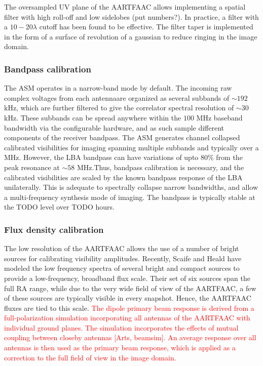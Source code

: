 \documentclass{aa}
\begin{document}
The oversampled UV plane of the AARTFAAC allows implementing a spatial
filter with high roll-off and low sidelobes (put numbers?). In practice,
a filter with a $10-20\lambda$ cutoff has been found to be effective.
The filter taper is implemented in the form of a surface of revolution
of a gaussian to reduce ringing in the image domain.


\subsubsection{Bandpass calibration}

The ASM operates in a narrow-band mode by default. The incoming raw
complex voltages from each antennaare organized as several subbands
of $\sim$$192$ kHz, which are further filtered to give the correlator
spectral resolution of $\sim$$30$ kHz. These subbands can be spread
anywhere within the $100$ MHz baseband bandwidth via the configurable
hardware, and as such sample different components of the receiver
bandpass. The ASM generates channel collapsed calibrated visibilities
for imaging spanning multiple subbands and typically over a MHz. However,
the LBA bandpass can have variations of upto 80\% from the peak resonance
at $\sim$$58$ MHz\citep{vanhaarlem2013lofar}.Thus, bandpass calibration
is necessary, and the calibrated visibilities are scaled by the known
bandpass response of the LBA unilaterally. This is adequate to spectrally
collapse narrow bandwidths, and allow a multi-frequency synthesis
mode of imaging. The bandpass is typically stable at the TODO level
over TODO hours.


\subsubsection{Flux density calibration}

The low resolution of the AARTFAAC allows the use of a number of bright
sources for calibrating visibility amplitudes. Recently, Scaife and
Heald\citep{scaife2012broad} have modeled the low frequency spectra
of several bright and compact sources to provide a low-frequency,
broadband flux scale. Their set of six sources span the full RA range,
while due to the very wide field of view of the AARTFAAC, a few of
these sources are typically visible in every snapshot. Hence, the
AARTFAAC fluxes are tied to this scale. \textcolor{red}{The dipole
primary beam response is derived from a full-polarization simulation
incorporating all antennas of the AARTFAAC with individual ground
planes. The simulation incorporates the effects of mutual coupling
between closeby antennas {[}Arts, beamsim{]}. An average response
over all antennas is then used as the primary beam response, which
is applied as a correction to the full field of view in the image
domain.}
\end{document}
